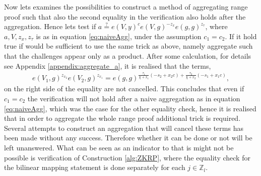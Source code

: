 Now lets examines the possibilities to construct a method of aggregating range proof such that also the second equality in the verification also holds after the aggregation. Hence lets test if $a \overset{?}{=} e(V,y)^c e(V,g)^{-z_x}e(g,g)^{z_\tau}$, where $a,V,z_{x},z_\tau$  is as in equation \eqref{eq:naiveAgg}, under the assumption $c_1=c_2$. If it hold true if would be sufficient to use the same trick as above, namely aggregate such that the challenges appear only as a product. After some calculation, for details see Appendix \ref{appendix:aggregate_a}, it is realised that the terms,
\begin{align*}
e(V_1,g)^{z_{x_2}}e(V_2,g)^{z_{x_1}} = e(g,g)^{\frac{\tau_1}{\chi + x_1}(-s_2+x_2c) +\frac{\tau_2}{\chi + x_2}(-s_1+x_1c)   } ,
\end{align*}
on the right side of the equality are not cancelled. This concludes that even if $c_1=c_2$ the verification will not hold after a naive aggregation as in equation \eqref{eq:naiveAgg}, which was the case for the other equality check,  hence it is realised that in order to aggregate the whole range proof additional trick is required. Several attempts to construct an aggregation that will cancel these terms has been made without any success. Therefore whether it can be done or not will be left unanswered. What can be seen as an indicator to that is might not be possible is verification of Construction \ref{alg:ZKRP}, where the equality check for the bilinear mapping statement is done separately for each $j\in\mathds{Z}_l$. 




